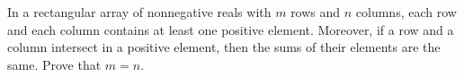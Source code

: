 In a rectangular array of nonnegative reals with $m$ rows and $n$ columns, each row and each column contains at least one positive element. Moreover, if a row and a column intersect in a positive element, then the sums of their elements are the same. Prove that $m=n$.